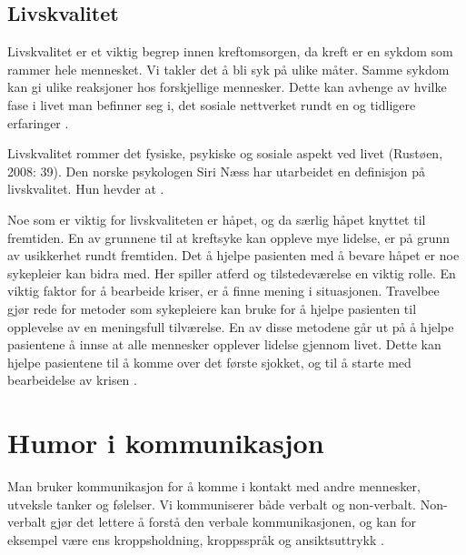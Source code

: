 \subsection{Livskvalitet}

Livskvalitet er et viktig begrep innen kreftomsorgen, da kreft er en sykdom som
rammer hele mennesket. Vi takler det å bli syk på ulike måter. Samme sykdom kan
gi ulike reaksjoner hos forskjellige mennesker. Dette kan avhenge av hvilke
fase i livet man befinner seg i, det sosiale nettverket rundt en og tidligere
erfaringer \cite[s.~39]{rustoen2008}.

Livskvalitet rommer det fysiske, psykiske og sosiale aspekt ved livet (Rustøen,
2008: 39). Den norske psykologen Siri Næss har utarbeidet en definisjon på
livskvalitet. Hun hevder at .

Noe som er viktig for livskvaliteten er håpet, og da særlig håpet knyttet til
fremtiden. En av grunnene til at kreftsyke kan oppleve mye lidelse, er på grunn
av usikkerhet rundt fremtiden. Det å hjelpe pasienten med å bevare håpet er noe
sykepleier kan bidra med. Her spiller atferd og tilstedeværelse en viktig
rolle. En viktig faktor for å bearbeide kriser, er å finne mening i
situasjonen. Travelbee gjør rede for metoder som sykepleiere kan bruke for å
hjelpe pasienten til opplevelse av en meningsfull tilværelse. En av disse
metodene går ut på å hjelpe pasientene å innse at alle mennesker opplever
lidelse gjennom livet. Dette kan hjelpe pasientene til å komme over det første
sjokket, og til å starte med bearbeidelse av krisen
\cite[s.~40--42]{rustoen2008}.

\section{Humor i kommunikasjon}

Man bruker kommunikasjon for å komme i kontakt med andre mennesker, utveksle
tanker og følelser. Vi kommuniserer både verbalt og non-verbalt. Non-verbalt
gjør det lettere å forstå den verbale kommunikasjonen, og kan for eksempel være
ens kroppsholdning, kroppsspråk og ansiktsuttrykk
\cite[s.~65--67]{reitan2008.kommunikasjon}.


